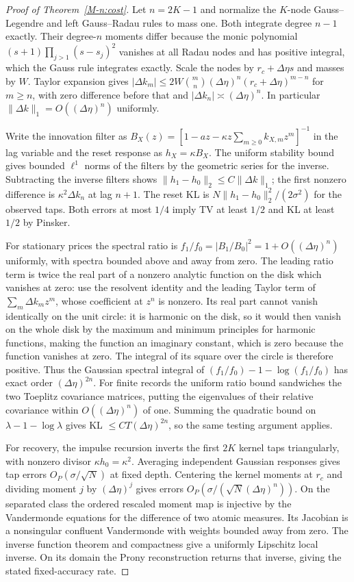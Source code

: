 \documentclass[12pt]{article}
\theoremstyle{definition}
\theoremstyle{remark}
\begin{document}
\begin{proof}[Proof of Theorem~\ref{M-n:cost}]
Let $n=2K-1$ and normalize the $K$-node Gauss--Legendre and left Gauss--Radau rules to mass one. Both integrate degree $n-1$ exactly. Their degree-$n$ moments differ because the monic polynomial $(s+1)\prod_{j>1}(s-s_j)^2$ vanishes at all Radau nodes and has positive integral, which the Gauss rule integrates exactly. Scale the nodes by $r_c+\Delta\eta s$ and masses by $W$. Taylor expansion gives $|\Delta k_m|\le 2W\binom{m}{n}(\Delta\eta)^n(r_c+\Delta\eta)^{m-n}$ for $m\ge n$, with zero difference before that and $|\Delta k_n|\asymp(\Delta\eta)^n$. In particular $\|\Delta k\|_1=O((\Delta\eta)^n)$ uniformly.

Write the innovation filter as $B_X(z)=[1-az-\kappa z\sum_{m\ge0}k_{X,m}z^m]^{-1}$ in the lag variable and the reset response as $h_X=\kappa B_X$. The uniform stability bound gives bounded $\ell^1$ norms of the filters by the geometric series for the inverse. Subtracting the inverse filters shows $\|h_1-h_0\|_2\le C\|\Delta k\|_1$; the first nonzero difference is $\kappa^2\Delta k_n$ at lag $n+1$. The reset KL is $N\|h_1-h_0\|_2^2/(2\sigma^2)$ for the observed taps. Both errors at most $1/4$ imply TV at least $1/2$ and KL at least $1/2$ by Pinsker.

For stationary prices the spectral ratio is $f_1/f_0=|B_1/B_0|^2=1+O((\Delta\eta)^n)$ uniformly, with spectra bounded above and away from zero. The leading ratio term is twice the real part of a nonzero analytic function on the disk which vanishes at zero: use the resolvent identity and the leading Taylor term of $\sum_m \Delta k_m z^m$, whose coefficient at $z^n$ is nonzero. Its real part cannot vanish identically on the unit circle: it is harmonic on the disk, so it would then vanish on the whole disk by the maximum and minimum principles for harmonic functions, making the function an imaginary constant, which is zero because the function vanishes at zero. The integral of its square over the circle is therefore positive. Thus the Gaussian spectral integral of $(f_1/f_0)-1-\log(f_1/f_0)$ has exact order $(\Delta\eta)^{2n}$. For finite records the uniform ratio bound sandwiches the two Toeplitz covariance matrices, putting the eigenvalues of their relative covariance within $O((\Delta\eta)^n)$ of one. Summing the quadratic bound on $\lambda-1-\log\lambda$ gives KL $\le CT(\Delta\eta)^{2n}$, so the same testing argument applies.

For recovery, the impulse recursion inverts the first $2K$ kernel taps triangularly, with nonzero divisor $\kappa h_0=\kappa^2$. Averaging independent Gaussian responses gives tap errors $O_P(\sigma/\sqrt N)$ at fixed depth. Centering the kernel moments at $r_c$ and dividing moment $j$ by $(\Delta\eta)^j$ gives errors $O_P(\sigma/(\sqrt N(\Delta\eta)^n))$. On the separated class the ordered rescaled moment map is injective by the Vandermonde equations for the difference of two atomic measures. Its Jacobian is a nonsingular confluent Vandermonde with weights bounded away from zero. The inverse function theorem and compactness give a uniformly Lipschitz local inverse. On its domain the Prony reconstruction returns that inverse, giving the stated fixed-accuracy rate.
\end{proof}
\end{document}
